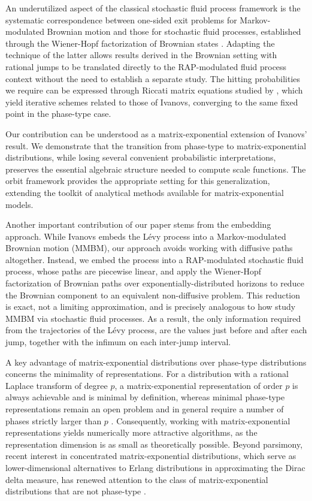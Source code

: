 \documentclass[a4paper,11pt]{article}
\numberwithin{equation}{section}
\theoremstyle{plain}
\theoremstyle{definition}
\newcommand{\1}{\mathbf{1}}
\begin{document}
An underutilized aspect of the classical stochastic fluid process framework is the systematic correspondence between one-sided exit problems for Markov-modulated Brownian motion and those for stochastic fluid processes, established through the Wiener-Hopf factorization of Brownian states \cite{NguyenPeralta2019}. Adapting the technique of the latter allows results derived in the Brownian setting with rational jumps to be translated directly to the RAP-modulated fluid process context without the need to establish a separate study. The hitting probabilities we require can be expressed through Riccati matrix equations studied by \cite{BeanNguyenNielsenPeralta2022}, which yield iterative schemes related to those of Ivanovs, converging to the same fixed point in the phase-type case.

Our contribution can be understood as a matrix-exponential extension of Ivanovs' result. We demonstrate that the transition from phase-type to matrix-exponential distributions, while losing several convenient probabilistic interpretations, preserves the essential algebraic structure needed to compute scale functions. The orbit framework provides the appropriate setting for this generalization, extending the toolkit of analytical methods available for matrix-exponential models.


Another important contribution of our paper stems from the embedding approach. While Ivanovs embeds the L\'evy process into a Markov-modulated Brownian motion (MMBM), our approach avoids working with diffusive paths altogether. Instead, we embed the process into a RAP-modulated stochastic fluid process, whose paths are piecewise linear, and apply the Wiener-Hopf factorization of Brownian paths over exponentially-distributed horizons to reduce the Brownian component to an equivalent non-diffusive problem. This reduction is exact, not a limiting approximation, and is precisely analogous to how \cite[Section 4]{NguyenPeralta2019} study MMBM via stochastic fluid processes. As a result, the only information required from the trajectories of the L\'evy process, are the values just before and after each jump, together with the infimum on each inter-jump interval.

A key advantage of matrix-exponential distributions over phase-type distributions concerns the minimality of representations. For a distribution with a rational Laplace transform of degree $p$, a matrix-exponential representation of order $p$ is always achievable and is minimal by definition, whereas minimal phase-type representations remain an open problem and in general require a number of phases strictly larger than $p$ \cite{o1990characterization}. Consequently, working with matrix-exponential representations yields numerically more attractive algorithms, as the representation dimension is as small as theoretically possible. Beyond parsimony, recent interest in concentrated matrix-exponential distributions, which serve as lower-dimensional alternatives to Erlang distributions in approximating the Dirac delta measure, has renewed attention to the class of matrix-exponential distributions that are not phase-type \cite{horvath2016concentrated,horvath2020high,horvath2020numerical,meszaros2022concentrated}. 
\end{document}
